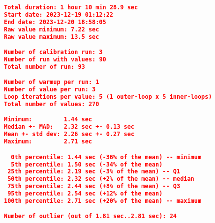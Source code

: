 \begin{lstlisting}[language=json]
Total duration: 1 hour 10 min 28.9 sec
Start date: 2023-12-19 01:12:22
End date: 2023-12-20 18:58:05
Raw value minimum: 7.22 sec
Raw value maximum: 13.5 sec

Number of calibration run: 3
Number of run with values: 90
Total number of run: 93

Number of warmup per run: 1
Number of value per run: 3
Loop iterations per value: 5 (1 outer-loop x 5 inner-loops)
Total number of values: 270

Minimum:         1.44 sec
Median +- MAD:   2.32 sec +- 0.13 sec
Mean +- std dev: 2.26 sec +- 0.27 sec
Maximum:         2.71 sec

  0th percentile: 1.44 sec (-36% of the mean) -- minimum
  5th percentile: 1.50 sec (-34% of the mean)
 25th percentile: 2.19 sec (-3% of the mean) -- Q1
 50th percentile: 2.32 sec (+2% of the mean) -- median
 75th percentile: 2.44 sec (+8% of the mean) -- Q3
 95th percentile: 2.54 sec (+12% of the mean)
100th percentile: 2.71 sec (+20% of the mean) -- maximum

Number of outlier (out of 1.81 sec..2.81 sec): 24
\end{lstlisting}

